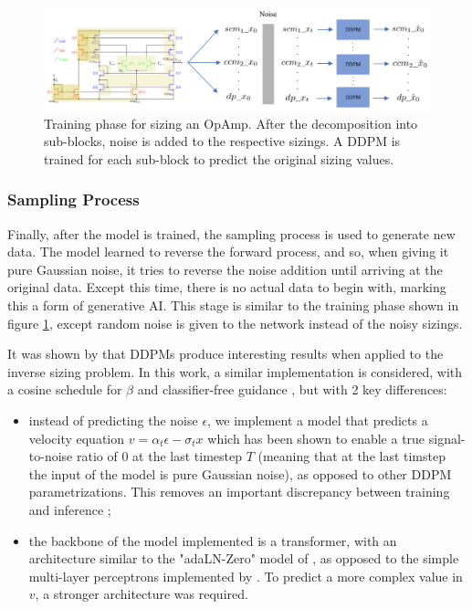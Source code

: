 \documentclass[conference]{IEEEtran}
\begin{document}
	\begin{figure}[h]
		\centering
		\includegraphics[width=\linewidth]{figures/DDPMSubBlockTraining}
		\setlength{\abovecaptionskip}{0ex}%
		\setlength{\belowcaptionskip}{-2ex}%
		\caption{Training phase for sizing an OpAmp. After the decomposition into sub-blocks, noise is added to the respective sizings. A DDPM is trained for each sub-block to predict the original sizing values.}
		\label{fig:DDPMtraining}
	\end{figure}
	
	\subsubsection{Sampling Process}
	Finally, after the model is trained, the sampling process is used to generate new data. The model learned to reverse the forward process, and so, when giving it pure Gaussian noise, it tries to reverse the noise addition until arriving at the original data. Except this time, there is no actual data to begin with, marking this a form of generative AI. This stage is similar to the training phase shown in figure \ref{fig:DDPMtraining}, except random noise is given to the network instead of the noisy sizings.
	
	It was shown by \cite{eid24diffusion} that DDPMs produce interesting results when applied to the inverse sizing problem. In this work, a similar implementation is considered, with a cosine schedule for $\beta$ and classifier-free guidance \cite{ho2022classifierfreediffusionguidance}, but with 2 key differences:
	
	\begin{itemize}
		\item instead of predicting the noise $\epsilon$, we implement a model that predicts a velocity equation $v=\alpha_{t}\epsilon - \sigma_{t}x$ which has been shown to enable a true signal-to-noise ratio of $0$ at the last timestep $T$ (meaning that at the last timstep the input of the model is pure Gaussian noise), as opposed to other DDPM parametrizations. This removes an important discrepancy between training and inference \cite{lin2024commondiffusionnoiseschedules};
		\item the backbone of the model implemented  is a transformer, with an architecture similar to the "adaLN-Zero" model of  \cite{peebles2023scalablediffusionmodelstransformers}, as opposed to the simple multi-layer perceptrons implemented by \cite{eid24diffusion}. To predict a more complex value in $v$, a stronger architecture was required.
	\end{itemize}
	
\end{document}
